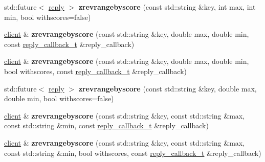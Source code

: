 \begin{DoxyCompactItemize}
std\+::future$<$ \mbox{\hyperlink{classcpp__redis_1_1reply}{reply}} $>$ {\bfseries zrevrangebyscore} (const std\+::string \&key, int max, int min, bool withscores=false)
\item 
\mbox{\label{classcpp__redis_1_1client_a8f6819684fc0d53cbc2f1a1f311bb15c}} 
\mbox{\hyperlink{classcpp__redis_1_1client}{client}} \& {\bfseries zrevrangebyscore} (const std\+::string \&key, double max, double min, const \mbox{\hyperlink{classcpp__redis_1_1client_af7a65eb21aa25230bfbb0b0203c4fc04}{reply\+\_\+callback\+\_\+t}} \&reply\+\_\+callback)
\item 
\mbox{\label{classcpp__redis_1_1client_ab444013b2a1abd58dcfa8af9ebf89b4d}} 
\mbox{\hyperlink{classcpp__redis_1_1client}{client}} \& {\bfseries zrevrangebyscore} (const std\+::string \&key, double max, double min, bool withscores, const \mbox{\hyperlink{classcpp__redis_1_1client_af7a65eb21aa25230bfbb0b0203c4fc04}{reply\+\_\+callback\+\_\+t}} \&reply\+\_\+callback)
\item 
\mbox{\label{classcpp__redis_1_1client_a0bb954b5c0ecb32137fad2dd4f4ac8f8}} 
std\+::future$<$ \mbox{\hyperlink{classcpp__redis_1_1reply}{reply}} $>$ {\bfseries zrevrangebyscore} (const std\+::string \&key, double max, double min, bool withscores=false)
\item 
\mbox{\label{classcpp__redis_1_1client_a26b125caa689ec8fa1e66db4afe19e1a}} 
\mbox{\hyperlink{classcpp__redis_1_1client}{client}} \& {\bfseries zrevrangebyscore} (const std\+::string \&key, const std\+::string \&max, const std\+::string \&min, const \mbox{\hyperlink{classcpp__redis_1_1client_af7a65eb21aa25230bfbb0b0203c4fc04}{reply\+\_\+callback\+\_\+t}} \&reply\+\_\+callback)
\item 
\mbox{\label{classcpp__redis_1_1client_a6ba71594666d7af651e3ebb8794c8af7}} 
\mbox{\hyperlink{classcpp__redis_1_1client}{client}} \& {\bfseries zrevrangebyscore} (const std\+::string \&key, const std\+::string \&max, const std\+::string \&min, bool withscores, const \mbox{\hyperlink{classcpp__redis_1_1client_af7a65eb21aa25230bfbb0b0203c4fc04}{reply\+\_\+callback\+\_\+t}} \&reply\+\_\+callback)
\item 
\mbox{\label{classcpp__redis_1_1client_a6e5f0bb9b73d052bca725ddf55101687}} 

\end{DoxyCompactItemize}
